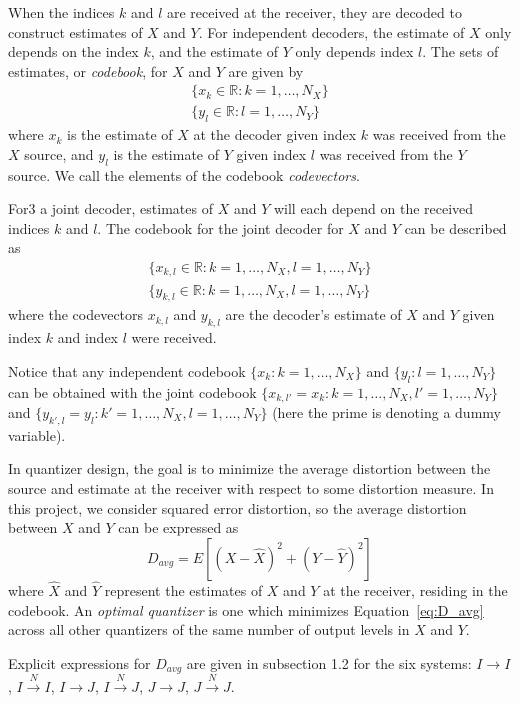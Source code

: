 \documentclass[10pt]{article}
\newcommand{\real}{\mathbb{R}}
\newcommand{\sysIIN}{\mbox{$I \overset{N}{\rightarrow} I$}}
\newcommand{\sysII}{\mbox{$I \rightarrow I$}}
\newcommand{\sysIJN}{\mbox{$I \overset{N}{\rightarrow} J$}}
\newcommand{\sysIJ}{\mbox{$I \rightarrow J$}}
\newcommand{\sysJJN}{\mbox{$J \overset{N}{\rightarrow} J$}}
\newcommand{\sysJJ}{\mbox{$J \rightarrow J$}}
\begin{document}
When the indices $k$ and $l$ are received at the receiver, they are decoded to construct estimates of $X$ and $Y$. For independent decoders, the estimate of $X$ only depends on the index $k$, and the estimate of $Y$ only depends index $l$. The sets of estimates, or \emph{codebook}, for $X$ and $Y$ are given by
\begin{gather*}
    \{x_k \in \real : k = 1,\ldots,N_X\} \\
    \{y_l \in \real : l = 1,\ldots,N_Y\}
\end{gather*}
where $x_k$ is the estimate of $X$ at the decoder given index $k$ was received from the $X$ source, and $y_l$ is the estimate of $Y$ given index $l$ was received from the $Y$ source. We call the elements of the codebook \emph{codevectors}.

For3 a joint decoder, estimates of $X$ and $Y$ will each depend on the received indices $k$ and $l$. The codebook for the joint decoder for $X$ and $Y$ can be described as
\begin{gather*}
    \{x_{k,l} \in \real : k = 1,\ldots,N_X, l = 1,\ldots,N_Y\} \\
    \{y_{k,l} \in \real : k = 1,\ldots,N_X, l = 1,\ldots,N_Y\}
\end{gather*}
where the codevectors $x_{k,l}$ and $y_{k,l}$ are the decoder's estimate of $X$ and $Y$ given index $k$ and index $l$ were received.

Notice that any independent codebook $\{x_k : k = 1,\ldots,N_X\}$ and $\{y_l : l = 1,\ldots,N_Y\}$ can be obtained with the joint codebook $\{x_{k,l'}=x_k : k=1,\ldots,N_X, l'=1,\ldots,N_Y\}$ and $\{y_{k',l}=y_l : k'=1,\ldots,N_X, l=1,\ldots,N_Y\}$ (here the prime is denoting a dummy variable).

In quantizer design, the goal is to minimize the average distortion between the source and estimate at the receiver with respect to some distortion measure. In this project, we consider squared error distortion, so the average distortion between $X$ and $Y$ can be expressed as
\begin{equation}
    \label{eq:D_avg}
    D_{avg} = E[{(X-\hat{X})}^2 + {(Y-\hat{Y})}^2]
\end{equation}
where $\hat{X}$ and $\hat{Y}$ represent the estimates of $X$ and $Y$ at the receiver, residing in the codebook. An \emph{optimal quantizer} is one which minimizes Equation~\ref{eq:D_avg} across all other quantizers of the same number of output levels in $X$ and $Y$.

Explicit expressions for $D_{avg}$ are given in subsection 1.2 for the six systems: \sysII, \sysIIN, \sysIJ, \sysIJN, \sysJJ, \sysJJN\@.
\end{document}
